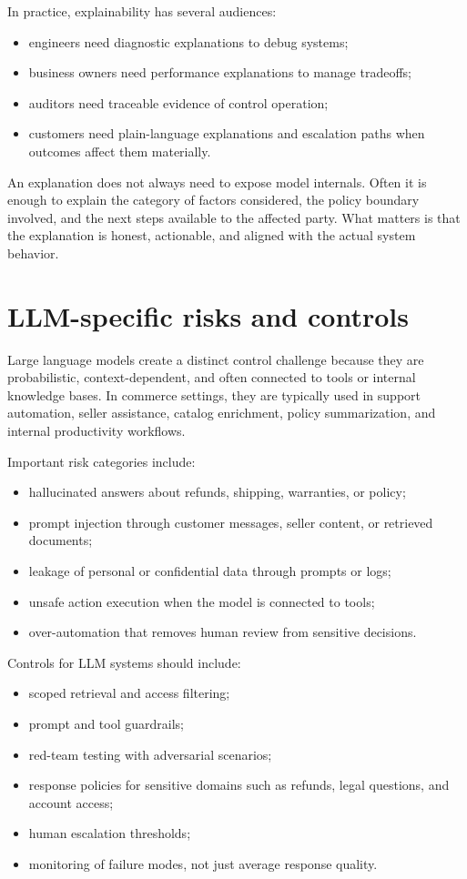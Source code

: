 In practice, explainability has several audiences:
\begin{itemize}
  \item engineers need diagnostic explanations to debug systems;
  \item business owners need performance explanations to manage tradeoffs;
  \item auditors need traceable evidence of control operation;
  \item customers need plain-language explanations and escalation paths when outcomes affect them materially.
\end{itemize}

An explanation does not always need to expose model internals. Often it is enough to explain the category of factors considered, the policy boundary involved, and the next steps available to the affected party. What matters is that the explanation is honest, actionable, and aligned with the actual system behavior.

\section{LLM-specific risks and controls}
Large language models create a distinct control challenge because they are probabilistic, context-dependent, and often connected to tools or internal knowledge bases. In commerce settings, they are typically used in support automation, seller assistance, catalog enrichment, policy summarization, and internal productivity workflows.

Important risk categories include:
\begin{itemize}
  \item hallucinated answers about refunds, shipping, warranties, or policy;
  \item prompt injection through customer messages, seller content, or retrieved documents;
  \item leakage of personal or confidential data through prompts or logs;
  \item unsafe action execution when the model is connected to tools;
  \item over-automation that removes human review from sensitive decisions.
\end{itemize}

Controls for LLM systems should include:
\begin{itemize}
  \item scoped retrieval and access filtering;
  \item prompt and tool guardrails;
  \item red-team testing with adversarial scenarios;
  \item response policies for sensitive domains such as refunds, legal questions, and account access;
  \item human escalation thresholds;
  \item monitoring of failure modes, not just average response quality.
\end{itemize}


